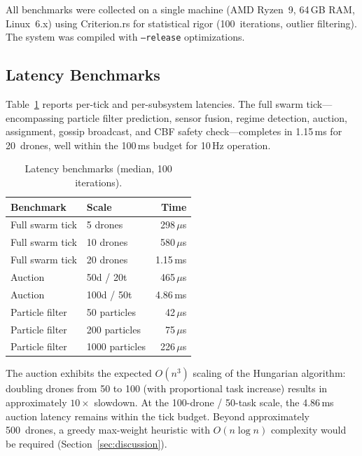 \documentclass[conference]{IEEEtran}
\begin{document}
All benchmarks were collected on a single machine (AMD Ryzen~9,
64\,GB RAM, Linux~6.x) using Criterion.rs for statistical rigor
(100~iterations, outlier filtering).  The system was compiled with
\texttt{--release} optimizations.

\subsection{Latency Benchmarks}

Table~\ref{tab:benchmarks} reports per-tick and per-subsystem
latencies.  The full swarm tick---encompassing particle filter
prediction, sensor fusion, regime detection, auction, assignment,
gossip broadcast, and CBF safety check---completes in 1.15\,ms for
20~drones, well within the 100\,ms budget for 10\,Hz operation.

\begin{table}[t]
\centering
\caption{Latency benchmarks (median, 100 iterations).}
\label{tab:benchmarks}
\begin{tabular}{@{}llr@{}}
\toprule
\textbf{Benchmark} & \textbf{Scale} & \textbf{Time} \\
\midrule
Full swarm tick      & 5 drones         & 298\,$\mu$s \\
Full swarm tick      & 10 drones        & 580\,$\mu$s \\
Full swarm tick      & 20 drones        & 1.15\,ms \\
\midrule
Auction              & 50d / 20t        & 465\,$\mu$s \\
Auction              & 100d / 50t       & 4.86\,ms \\
\midrule
Particle filter      & 50 particles     & 42\,$\mu$s \\
Particle filter      & 200 particles    & 75\,$\mu$s \\
Particle filter      & 1000 particles   & 226\,$\mu$s \\
\bottomrule
\end{tabular}
\end{table}

The auction exhibits the expected $O(n^3)$ scaling of the Hungarian
algorithm: doubling drones from 50 to 100 (with proportional task
increase) results in approximately $10\times$ slowdown.  At the
100-drone / 50-task scale, the 4.86\,ms auction latency remains
within the tick budget.  Beyond approximately 500~drones, a greedy
max-weight heuristic with $O(n\log n)$ complexity would be required
(Section~\ref{sec:discussion}).
\end{document}
